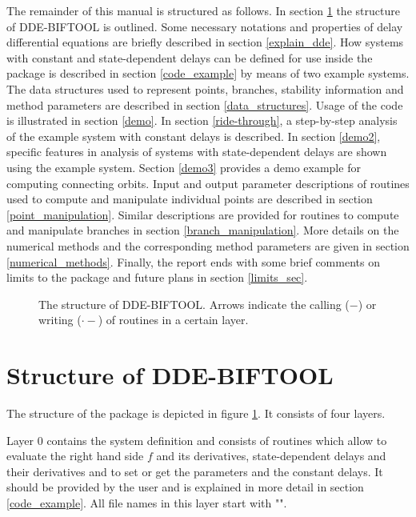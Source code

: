 \documentclass[10pt]{article}
\gdef \DDEBIFCODE{{\scshape DDE-BIFTOOL}}
\gdef \file#1{{\bfseries{\ttfamily{#1}}}}
\begin{document}
The remainder of this manual is structured as follows.
In section \ref{code_struct} the structure of {\DDEBIFCODE} is 
outlined.
Some necessary notations and properties of delay differential
equations are briefly described in section \ref{explain_dde}.
How systems with constant and state-dependent delays can be defined for 
use inside the package is described in section \ref{code_example}
by means of two example systems.
The data structures used to represent points, branches,
stability information and method parameters are 
described in section \ref{data_structures}.
Usage of the code is illustrated  in section \ref{demo}. 
In section \ref{ride-through}, a step-by-step 
analysis of the example system with constant delays is described.
In section \ref{demo2}, specific features in analysis of
systems with state-dependent delays are shown using
the example system. Section \ref{demo3} provides a demo
example for computing connecting orbits.
Input and output parameter descriptions of routines
used to compute and manipulate individual points are
described in section \ref{point_manipulation}.
Similar descriptions are provided for routines to compute and
manipulate branches in section \ref{branch_manipulation}.
More details on the numerical methods and the 
corresponding method parameters are given in 
section \ref{numerical_methods}.
Finally, the report ends with some brief comments on limits to the package
and future plans in section \ref{limits_sec}.

\begin{figure}[t]
\begin{center}
\end{center}
\caption{\small\label{struct_pic}
The structure of {\DDEBIFCODE}. Arrows indicate the 
calling ($-$) or writing ($\cdot-$) of routines in a certain layer.} 
\end{figure}

\section{Structure of {\DDEBIFCODE}}\label{code_struct}

The structure of the package is depicted in figure \ref{struct_pic}.
It consists of four layers. 

Layer 0 contains the system definition and consists of routines 
which allow to evaluate
the right hand side $f$ and its derivatives, state-dependent delays and 
their derivatives and
to set or get the parameters and the constant delays.
It should be provided by the user and is explained
in more detail in section \ref{code_example}.
All file names in this layer start with "\file{sys\_}".
\end{document}
